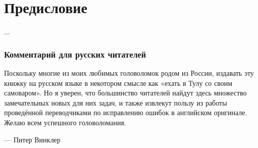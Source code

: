\chapter*{Предисловие}
...




\subsection*{Комментарий для русских читателей}

Поскольку многие из моих любимых головоломок родом из России, издавать эту книжку на русском языке в некотором смысле как «ехать в Тулу со своим самоваром».
Но я уверен, что большинство читателей найдут здесь множество замечательных новых для них задач, и также извлекут пользу из работы проведённой переводчиками по исправлению ошибок в английском оригинале.
Желаю всем успешного головоломания.

--- Питер Винклер
